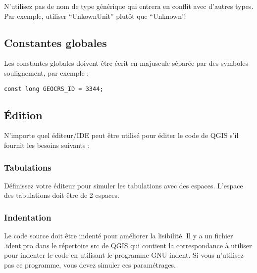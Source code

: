 N'utilisez pas de nom de type générique qui entrera en conflit avec d'autres types. Par exemple, utiliser ``UnkownUnit'' plutôt que ``Unknown''.

\subsection{Constantes globales}
Les constantes globales doivent être écrit en majuscule séparée par des symboles soulignement, par exemple :
\begin{verbatim}
const long GEOCRS_ID = 3344;
\end{verbatim}

\subsection{Édition}
N'importe quel éditeur/IDE peut être utilisé pour éditer le code de QGIS s'il fournit les besoins suivants :

\subsubsection{Tabulations}
Définissez votre éditeur pour simuler les tabulations avec des espaces. L'espace des tabulations doit être de 2 espaces.

\subsubsection{Indentation}
Le code source doit être indenté pour améliorer la lisibilité. Il y a un fichier .ident.pro dans le répertoire src de QGIS qui contient la correspondance à utiliser pour indenter le code en utilisant le programme GNU indent. Si vous n'utilisez pas ce programme, vous devez simuler ces paramétrages.

